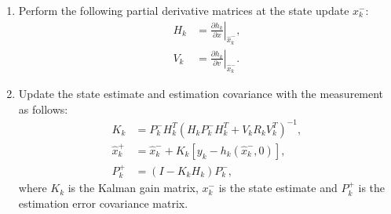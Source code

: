 \begin{enumerate}
    \item Perform the following partial derivative matrices at the state update ${x}_{k}^{-}$:
        \begin{equation}
        \begin{aligned}
        H_{k} & =\left.\frac{\partial h_{k}}{\partial x}\right|_{\hat{x}_{k}^{-}}, \\
        V_{k} & =\left.\frac{\partial h_{k}}{\partial v}\right|_{\hat{x}_{k}^{-}}.
        \end{aligned}
        \end{equation}

    \item Update the state estimate and estimation covariance with the measurement as follows:
        \begin{equation}
        \begin{aligned}
        K_{k} & =P_{k}^{-} H_{k}^{T}\left(H_{k} P_{k}^{-} H_{k}^{T}+V_{k} R_{k} V_{k}^{T}\right)^{-1}, \\
        \hat{x}_{k}^{+} & =\hat{x}_{k}^{-}+K_{k}\left[y_{k}-h_{k}\left(\hat{x}_{k}^{-}, 0\right)\right], \\
        P_{k}^{+} & =\left(I-K_{k} H_{k}\right) P_{k}^{-},
        \end{aligned}
        \end{equation}
    where $K_k$ is the Kalman gain matrix, ${x}_{k}^{-}$ is the state estimate and $P_{k}^{+}$ is the estimation error covariance matrix.
        
\end{enumerate}













